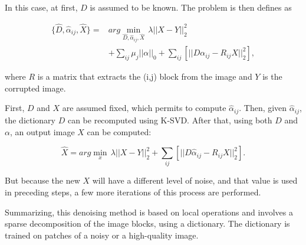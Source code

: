 In this case, at first, $D$ is assumed to be known. The problem is then defines as

\begin{equation}
	\begin{split}
    		\{\hat{D},\hat{\alpha}_{ij},\hat{X}\} = &arg \displaystyle\min_{\hat{D},\hat{\alpha}_{ij},\hat{X}}\,\lambda||X-Y||_{2}^{2}\\&+\displaystyle \sum_{ij}\mu_{j}||\alpha||_{0}+\displaystyle \sum_{ij}[||D\alpha_{ij}-R_{ij}X||_{2}^{2}],
	\end{split}
    \label{eq:ksvd_3}
\end{equation}

where $R$ is a matrix that extracts the (i,j) block from the image and $Y$ is the corrupted image.

First, $D$ and $X$ are assumed fixed, which permits to compute $\hat{\alpha}_{ij}$. Then, given $\hat{\alpha}_{ij}$, the dictionary $D$ can be recomputed using K-SVD. After that, using both $D$ and $\alpha$, an output image $X$ can be computed:

\begin{equation}
    \hat{X}=arg\displaystyle\min_{x}\,\lambda||X-Y||_{2}^{2}+\displaystyle \sum_{ij}[||D\hat{\alpha}_{ij}-R_{ij}X||_{2}^{2}].
    \label{eq:ksvd_4}
\end{equation}

But because the new $X$ will have a different level of noise, and that value is used in preceding steps, a few more iterations of this process are performed.

Summarizing, this denoising method is based on local operations and involves a sparse decomposition of the image blocks, using a dictionary. The dictionary is trained on patches of a noisy or a high-quality image.